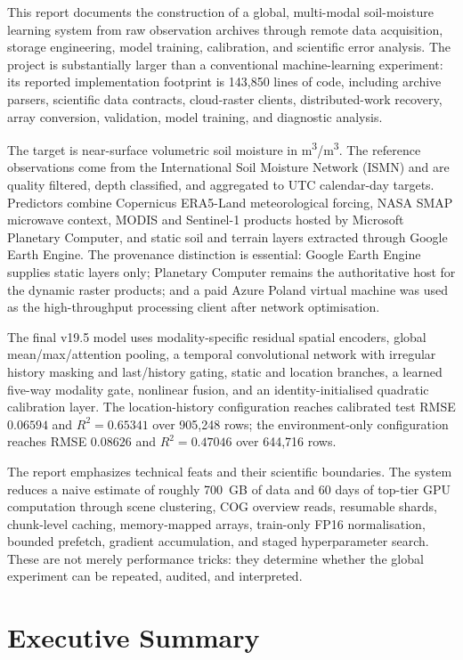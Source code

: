\documentclass[12pt,a4paper]{report}
\begin{document}
This report documents the construction of a global, multi-modal soil-moisture
learning system from raw observation archives through remote data acquisition,
storage engineering, model training, calibration, and scientific error analysis.
The project is substantially larger than a conventional machine-learning
experiment: its reported implementation footprint is 143,850 lines of code,
including archive parsers, scientific data contracts, cloud-raster clients,
distributed-work recovery, array conversion, validation, model training, and
diagnostic analysis.

The target is near-surface volumetric soil moisture in \si{m^3/m^3}. The
reference observations come from the International Soil Moisture Network (ISMN)
and are quality filtered, depth classified, and aggregated to UTC calendar-day
targets. Predictors combine Copernicus ERA5-Land meteorological forcing, NASA
SMAP microwave context, MODIS and Sentinel-1 products hosted by Microsoft
Planetary Computer, and static soil and terrain layers extracted through Google
Earth Engine. The provenance distinction is essential: Google Earth Engine
supplies static layers only; Planetary Computer remains the authoritative host
for the dynamic raster products; and a paid Azure Poland virtual machine was
used as the high-throughput processing client after network optimisation.

The final v19.5 model uses modality-specific residual spatial encoders, global
mean/max/attention pooling, a temporal convolutional network with irregular
history masking and last/history gating, static and location branches, a learned
five-way modality gate, nonlinear fusion, and an identity-initialised quadratic
calibration layer. The location-history configuration reaches calibrated test
RMSE $0.06594$ and $R^2=0.65341$ over 905,248 rows; the environment-only
configuration reaches RMSE $0.08626$ and $R^2=0.47046$ over 644,716 rows.

The report emphasizes technical feats and their scientific boundaries. The
system reduces a naive estimate of roughly 700~GB of data and 60 days of
top-tier GPU computation through scene clustering, COG overview reads, resumable
shards, chunk-level caching, memory-mapped arrays, train-only FP16
normalisation, bounded prefetch, gradient accumulation, and staged
hyperparameter search. These are not merely performance tricks: they determine
whether the global experiment can be repeated, audited, and interpreted.

\chapter*{Executive Summary}
\end{document}
